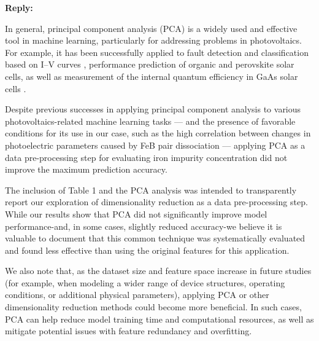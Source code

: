 \documentclass[a4paper,fleqn]{cas-sc}
\begin{document}
\noindent
\textcolor[rgb]{0.51,0.00,0.00}{\textbf{Reply:}}

In general, principal component analysis (PCA) is a widely used and effective tool in machine learning,
particularly for addressing problems in photovoltaics.
For example, it has been successfully applied to fault detection and classification based on I–V curves \cite{Fadhel2019, Gao2020},
performance prediction of organic \cite{David2021} and perovskite \cite{Liu2022} solar cells,
as well as measurement of the internal quantum efficiency in GaAs solar cells \cite{AbdullahVetter2025}.

Despite previous successes in applying principal component analysis to various photovoltaics-related machine learning tasks ---
and the presence of favorable conditions for its use in our case,
such as the high correlation between changes in photoelectric parameters caused by FeB pair dissociation ---
applying PCA as a data pre-processing step for evaluating iron impurity concentration did not improve the maximum prediction accuracy.







The inclusion of Table 1 and the PCA analysis was intended to transparently report our exploration of dimensionality reduction as a data pre-processing step.
While our results show that PCA did not significantly improve model performance-and, in some cases, slightly reduced accuracy-we believe it is valuable to document that this common technique was systematically evaluated and found less effective than using the original features for this application.


We also note that, as the dataset size and feature space increase in future studies (for example, when modeling a wider range of device structures, operating conditions, or additional physical parameters), applying PCA or other dimensionality reduction methods could become more beneficial.
In such cases, PCA can help reduce model training time and computational resources, as well as mitigate potential issues with feature redundancy and overfitting.
\end{document}
